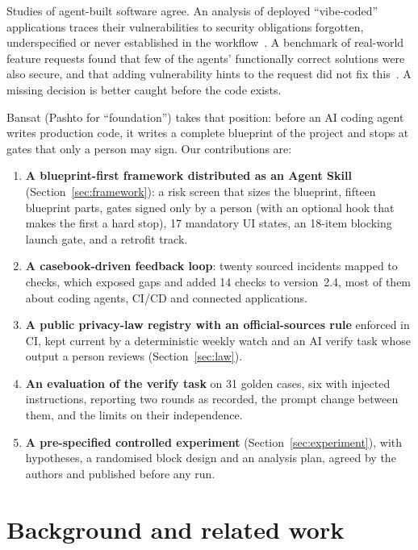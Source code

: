 \documentclass[11pt,a4paper]{article}
\begin{document}
Studies of agent-built software agree. An analysis of deployed ``vibe-coded'' applications traces their vulnerabilities
to security obligations forgotten, underspecified or never established in the workflow~\cite{deng2026vibecoded}. A benchmark of real-world feature requests found that few
of the agents' functionally correct solutions were also secure, and that adding vulnerability hints to the request did
not fix this~\cite{zhao2025susvibes}. A missing decision is better caught before the code exists.

Bansat (Pashto for ``foundation'') takes that position: before an AI coding agent writes production code, it writes a
complete blueprint of the project and stops at gates that only a person may sign. Our contributions are:
\begin{enumerate}
  \item \textbf{A blueprint-first framework distributed as an Agent Skill} (Section~\ref{sec:framework}): a risk
  screen that sizes the blueprint, fifteen blueprint parts, gates signed only by a person (with an optional hook that
  makes the first a hard stop), 17 mandatory UI states, an 18-item blocking launch gate, and a retrofit track.
  \item \textbf{A casebook-driven feedback loop}: twenty sourced incidents mapped to checks, which exposed gaps and added
  14 checks to version~2.4, most of them about coding agents, CI/CD and connected applications.
  \item \textbf{A public privacy-law registry with an official-sources rule} enforced in CI, kept current by a
  deterministic weekly watch and an AI verify task whose output a person reviews (Section~\ref{sec:law}).
  \item \textbf{An evaluation of the verify task} on 31 golden cases, six with injected instructions, reporting two
  rounds as recorded, the prompt change between them, and the limits on their independence.
  \item \textbf{A pre-specified controlled experiment} (Section~\ref{sec:experiment}), with hypotheses, a randomised
  block design and an analysis plan, agreed by the authors and published before any run.
\end{enumerate}

\section{Background and related work}\label{sec:related}
\end{document}
